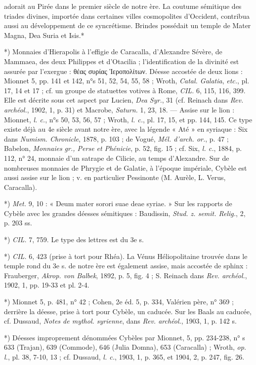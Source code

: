 \documentclass[a4paper, 11pt, oneside, polutonikogreek, french]{article}
\begin{document}
adorait au Pirée dans le premier siècle de notre ère. La coutume sémitique des triades divines, importée dans certaines villes cosmopolites d'Occident, contribua aussi au développement de ce syncrétisme. Brindes possédait un temple de Mater Magna, Dea Suria et Isis.*

*) Monnaies d'Hierapolis à l'effigie de Caracalla, d'Alexandre Sévère, de Mammaea, des deux Philippes et d'Otacilia ; l'identification de la divinité est assurée par l'exergue : θέας συρίας Ἱεροπολίτων. Déesse accostée de deux lions : Mionnet 5, pp. 141 et 142, n°s 51, 52, 54, 55, 58 ; Wroth, \emph{Catal. Galatia}, \emph{etc.}, pl. 17, 14 et 17 ; cf. un groupe de statuettes votives à Rome, \emph{CIL.} 6, 115, 116, 399. Elle est décrite sous cet aspect par Lucien, \emph{Dea Syr.}, 31 (cf. Reinach dans \emph{Rev. archéol.}, 1902, 1, p. 31) et Macrobe, \emph{Saturn.} 1, 23, 18. --- Assise sur le lion : Mionnet, \emph{l. c.}, n°s 50, 53, 56, 57 ; Wroth, \emph{l. c.}, pl. 17, 15, et pp. 144, 145. Ce type existe déjà au 4e siècle avant notre ère, avec la légende « Até » en syriaque : Six dans \emph{Numism. Chronicle}, 1878, p. 103 ; de Vogué, \emph{Mél. d'arch. or.}, p. 47 ; Babelon, \emph{Monnaies gr., Perse et Phénicie}, p. 52, fig. 15 ; cf. Six, \emph{l. c.}, 1884, p. 112, n° 24, monnaie d'un satrape de Cilicie, au temps d'Alexandre. Sur de nombreuses monnaies de Phrygie et de Galatie, à l'époque impériale, Cybèle est aussi assise sur le lion ; v. en particulier Pessinonte (M. Aurèle, L. Verus, Caracalla).

*) \emph{Met.} 9, 10 : « Deum mater sorori suae deae syriae. » Sur les rapports de Cybèle avec les grandes déesses sémitiques : Baudissin, \emph{Stud. z. semit. Relig.}, 2, p. 203 ss.

*) \emph{CIL.} 7, 759. Le type des lettres est du 3e s.

*) \emph{CIL.} 6, 423 (prise à tort pour Rhéa). La Vénus Héliopolitaine trouvée dans le temple rond du 3e s. de notre ère est également assise, mais accostée de sphinx : Frauberger, \emph{Akrop. von Balbek}, 1892, p. 5, fig. 4 ; S. Reinach dans \emph{Rev. archéol.}, 1902, 1, pp. 19-33 et pl. 2-4.

*) Mionnet 5, p. 481, n° 42 ; Cohen, 2e éd. 5, p. 334, Valérien père, n° 369 ; derrière la déesse, prise à tort pour Cybèle, un caducée. Sur les Baals au caducée, cf. Dussaud, \emph{Notes de mythol. syrienne}, dans \emph{Rev. archéol.}, 1903, 1, p. 142 s.

*) Déesses improprement dénommées Cybèles par Mionnet, 5, pp. 234-238, n° s 633 (Trajan), 639 (Commode), 646 (Julia Domna), 653 (Caracalla) ; Wroth, \emph{op. l.}, pl. 38, 7-10, 13 ; cf. Dussaud, \emph{l. c.}, 1903, 1, p. 365, et 1904, 2, p. 247, fig. 26.
\end{document}
